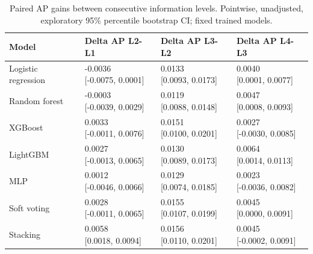 \begin{table}[htbp]
\centering
\small
\caption{Paired AP gains between consecutive information levels. Pointwise, unadjusted, exploratory 95\% percentile bootstrap CI; fixed trained models.}
\label{tab:rq2-sequential-gains}
\begin{tabular}{llll}
\toprule
Model & Delta AP L2-L1 & Delta AP L3-L2 & Delta AP L4-L3 \\
\midrule
Logistic regression & \shortstack{{-0.0036} \\ {[-0.0075, 0.0001]}} & \shortstack{{0.0133} \\ {[0.0093, 0.0173]}} & \shortstack{{0.0040} \\ {[0.0001, 0.0077]}} \\
Random forest & \shortstack{{-0.0003} \\ {[-0.0039, 0.0029]}} & \shortstack{{0.0119} \\ {[0.0088, 0.0148]}} & \shortstack{{0.0047} \\ {[0.0008, 0.0093]}} \\
XGBoost & \shortstack{{0.0033} \\ {[-0.0011, 0.0076]}} & \shortstack{{0.0151} \\ {[0.0100, 0.0201]}} & \shortstack{{0.0027} \\ {[-0.0030, 0.0085]}} \\
LightGBM & \shortstack{{0.0027} \\ {[-0.0013, 0.0065]}} & \shortstack{{0.0130} \\ {[0.0089, 0.0173]}} & \shortstack{{0.0064} \\ {[0.0014, 0.0113]}} \\
MLP & \shortstack{{0.0012} \\ {[-0.0046, 0.0066]}} & \shortstack{{0.0129} \\ {[0.0074, 0.0185]}} & \shortstack{{0.0023} \\ {[-0.0036, 0.0082]}} \\
Soft voting & \shortstack{{0.0028} \\ {[-0.0011, 0.0065]}} & \shortstack{{0.0155} \\ {[0.0107, 0.0199]}} & \shortstack{{0.0045} \\ {[0.0000, 0.0091]}} \\
Stacking & \shortstack{{0.0058} \\ {[0.0018, 0.0094]}} & \shortstack{{0.0156} \\ {[0.0110, 0.0201]}} & \shortstack{{0.0045} \\ {[-0.0002, 0.0091]}} \\
\bottomrule
\end{tabular}
\end{table}
